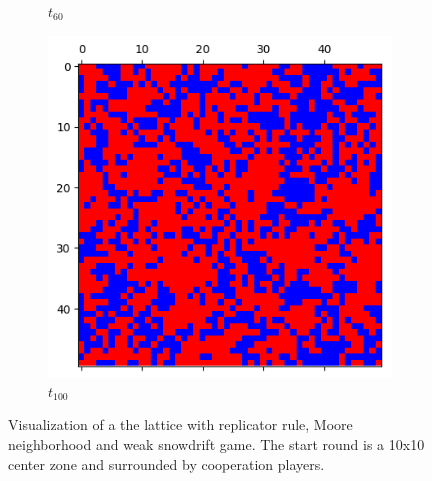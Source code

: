 \documentclass[letterpaper]{article}
\begin{document}
\begin{figure}[H]
\begin{subfigure}{.33\textwidth}
      \caption{$t_{60}$}
    \end{subfigure}
    \begin{subfigure}{.33\textwidth}
      \centering
      \includegraphics[width=1\linewidth]{images/assign2/part32-coop/t100}
      \caption{$t_{100}$}
    \end{subfigure}
    \caption{Visualization of a the lattice with replicator rule,
    Moore neighborhood and weak snowdrift game. The start round is
    a 10x10 center zone and surrounded by cooperation players.}
    \label{fig:visupart32-coop}
\end{figure}
\end{document}
